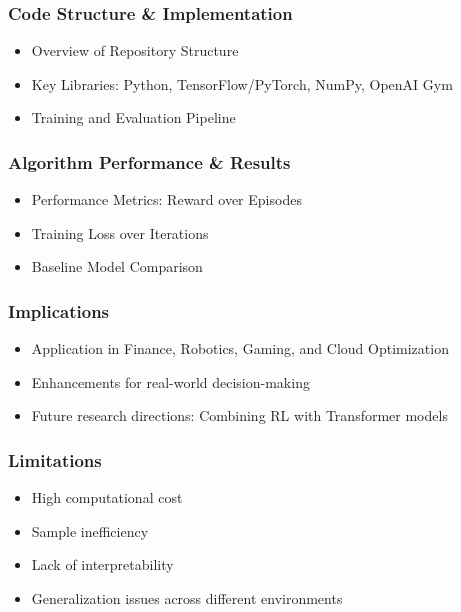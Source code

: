 \begin{frame}
    \frametitle{Code Structure \& Implementation}
    \begin{itemize}
        \item Overview of Repository Structure
        \item Key Libraries: Python, TensorFlow/PyTorch, NumPy, OpenAI Gym
        \item Training and Evaluation Pipeline
    \end{itemize}
    \centering
\end{frame}

\begin{frame}
    \frametitle{Algorithm Performance \& Results}
    \begin{itemize}
        \item Performance Metrics: Reward over Episodes
        \item Training Loss over Iterations
        \item Baseline Model Comparison
    \end{itemize}
    \centering
\end{frame}

\begin{frame}
    \frametitle{Implications}
    \begin{itemize}
        \item Application in Finance, Robotics, Gaming, and Cloud Optimization
        \item Enhancements for real-world decision-making
        \item Future research directions: Combining RL with Transformer models
    \end{itemize}
\end{frame}

\begin{frame}
    \frametitle{Limitations}
    \begin{itemize}
        \item High computational cost
        \item Sample inefficiency
        \item Lack of interpretability
        \item Generalization issues across different environments
    \end{itemize}
\end{frame}

